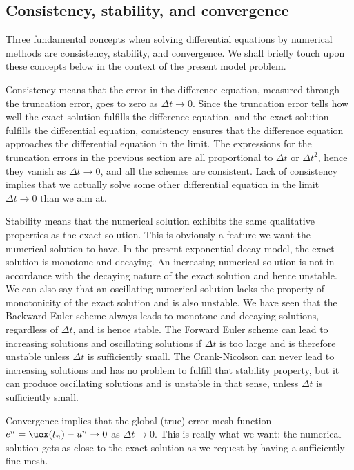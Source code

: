 \documentclass[graybox,sectrefs,envcountresetchap,open=right,final]{svmonodo}
\begin{document}
\subsection{Consistency, stability, and convergence}

  

Three fundamental concepts when solving differential equations by
numerical methods are consistency, stability, and convergence.  We
shall briefly touch upon these concepts below in the context of the present
model problem.

Consistency means that the error in the difference equation, measured
through the truncation error, goes to zero as $\Delta t\rightarrow
0$. Since the truncation error tells how well the exact solution
fulfills the difference equation, and the exact solution fulfills the
differential equation, consistency ensures that the difference
equation approaches the differential equation in the limit. The
expressions for the truncation errors in the previous section are all
proportional to $\Delta t$ or $\Delta t^2$, hence they vanish as
$\Delta t\rightarrow 0$, and all the schemes are consistent.  Lack of
consistency implies that we actually solve some other differential
equation in the limit $\Delta t\rightarrow 0$ than we aim at.

Stability means that the numerical solution exhibits the same
qualitative properties as the exact solution. This is obviously a
feature we want the numerical solution to have. In the present
exponential decay model, the exact solution is monotone and
decaying. An increasing numerical solution is not in accordance with
the decaying nature of the exact solution and hence unstable. We can
also say that an oscillating numerical solution lacks the property of
monotonicity of the exact solution and is also unstable. We have seen
that the Backward Euler scheme always leads to monotone and decaying
solutions, regardless of $\Delta t$, and is hence stable. The Forward
Euler scheme can lead to increasing solutions and oscillating
solutions if $\Delta t$ is too large and is therefore unstable unless
$\Delta t$ is sufficiently small.  The Crank-Nicolson can never lead
to increasing solutions and has no problem to fulfill that stability
property, but it can produce oscillating solutions and is unstable in
that sense, unless $\Delta t$ is sufficiently small.

Convergence implies that the global (true) error mesh function $e^n =
\uex(t_n)-u^n\rightarrow 0$ as $\Delta t\rightarrow 0$. This is really
what we want: the numerical solution gets as close to the exact
solution as we request by having a sufficiently fine mesh.
\end{document}
